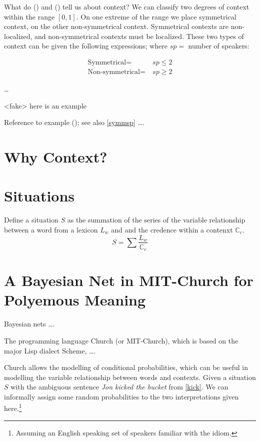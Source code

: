 \documentclass{article}
\begin{document}
What do () and () tell us about context? We can classify two degrees of context within the range $[0, 1]$. On one extreme of the range we place symmetrical context, on the other non-symmetrical context. Symmetrical contexts are non-localized, and non-symmetrical contexts must be localized. These two types of context can be given the following expressions; where $sp =$ number of speakers:

\begin{align}\label{symmsp}
   \text{Symmetrical} =& \ sp \leq 2 \\
   \text{Non-symmetrical} =& \ sp \geq 2   
\end{align}
 
\ldots

\ex<fake> here is an example
\xe

Reference to example (); see also \ref{symmsp} \ldots. 


\section{Why Context?}

\section{Situations}
Define a situation $S$ as the summation of the series of the variable relationship between a word from a lexicon $L_w$ and and the credence within a contenxt $\mathbb{C}_c$. 
\begin{equation}
S = \sum \frac{L_w}{\mathbb{C}_c}
\end{equation}
\section{A Bayesian Net in MIT-Church for Polyemous Meaning}
Bayesian nets \ldots.

The programming language Church (or MIT-Church), which is based on the major Lisp dialect Scheme, \ldots.

Church allows the modelling of conditional probabilities, which can be useful in modelling the variable relationship between words and contexts. Given a situation $S$ with the ambiguous sentence {\sl Jon kicked the bucket} from \ref{kick}. We can informally assign some random probabilities to the two interpretations given here.\footnote{Assuming an English speaking set of speakers familiar with the idiom.}
\end{document}
